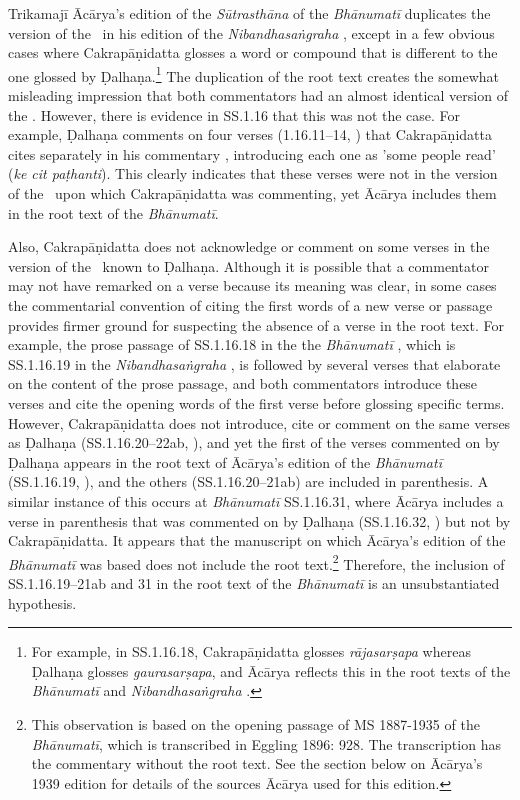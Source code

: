 Trikamajī Ācārya's edition of the \textit{Sūtrasthāna} of the \emph{Bhānumatī} \citep{acar-1939} duplicates the version of the \SS\ in his edition of the \emph{Nibandhasaṅgraha} \citep{vulgate}, except in a few obvious cases where Cakrapāṇidatta glosses a word or compound that is different to the one glossed by Ḍalhaṇa.\footnote{For example, in SS.1.16.18, Cakrapāṇidatta glosses \emph{rājasarṣapa} whereas Ḍalhaṇa glosses \emph{gaurasarṣapa}, and Ācārya reflects this in the root texts of the \emph{Bhānumatī} \citep[130]{acar-1939} and \emph{Nibandhasaṅgraha} \citep[79]{vulgate}.} The duplication of the root text creates the somewhat misleading impression that both commentators had an almost identical version of the \SS. However, there is evidence in SS.1.16 that this was not the case. For example, Ḍalhaṇa comments on four verses (1.16.11–14, \cite[78]{vulgate}) that Cakrapāṇidatta cites separately in his commentary \citep[128–129]{acar-1939}, introducing each one as 'some people read' (\emph{ke cit paṭhanti}). This clearly indicates that these verses were not in the version of the \SS\ upon which Cakrapāṇidatta was commenting, yet Ācārya includes them in the root text of the \emph{Bhānumatī}.

Also, Cakrapāṇidatta does not acknowledge or comment on some verses in the version of the \SS\ known to Ḍalhaṇa. Although it is possible that a commentator may not have remarked on a verse because its meaning was clear, in some cases the commentarial convention of citing the first words of a new verse or passage provides firmer ground for suspecting the absence of a verse in the root text. For example, the prose passage of SS.1.16.18 in the the \emph{Bhānumatī} \citep[130]{acar-1939}, which is SS.1.16.19 in the \emph{Nibandhasaṅgraha} \citep[79]{vulgate}, is followed by several verses that elaborate on the content of the prose passage, and both commentators introduce these verses and cite the opening words of the first verse before glossing specific terms. However, Cakrapāṇidatta does not introduce, cite or comment on the same verses as Ḍalhaṇa (SS.1.16.20–22ab, \cite[79]{vulgate}), and yet the first of the verses commented on by Ḍalhaṇa appears in the root text of Ācārya's edition of the \emph{Bhānumatī} (SS.1.16.19, \cite[130]{acar-1939}), and the others (SS.1.16.20–21ab) are included in parenthesis. A similar instance of this occurs at \emph{Bhānumatī} SS.1.16.31, where Ācārya includes a verse in parenthesis that was commented on by Ḍalhaṇa (SS.1.16.32, \cite[81]{vulgate}) but not by Cakrapāṇidatta. It appears that the manuscript on which Ācārya's edition of the \emph{Bhānumatī} was based does not include the root text.\footnote{This observation is based on the opening passage of MS 1887-1935 of the \emph{Bhānumatī}, which is transcribed in Eggling 1896: 928. The transcription has the commentary without the root text. See the section below on Ācārya's 1939 edition for details of the sources Ācārya used for this edition.} Therefore, the inclusion of SS.1.16.19–21ab and 31 in the root text of the \emph{Bhānumatī} is an unsubstantiated hypothesis. 


